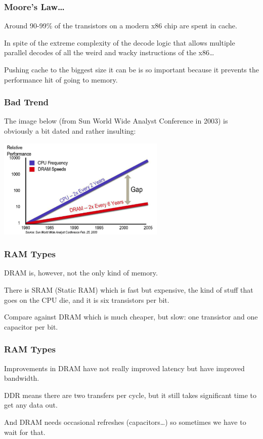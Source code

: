 \begin{frame}
\frametitle{Moore's Law\ldots}

Around 90-99\% of the transistors on a modern x86 chip are spent in cache. 

In spite of the extreme complexity of the decode logic that allows multiple parallel decodes of all the weird and wacky instructions of the x86\ldots

Pushing cache to the biggest size it can be is so important because it prevents the performance hit of going to memory.


\end{frame}



\begin{frame}
\frametitle{Bad Trend}

The image below (from Sun World Wide Analyst Conference in 2003) is obviously a bit dated and rather insulting:
\begin{center}
\includegraphics[width=0.6\textwidth]{images/ram-vs-cpu.png}
\end{center}

\end{frame}



\begin{frame}
\frametitle{RAM Types}

DRAM is, however, not the only kind of memory. 

There is SRAM (Static RAM) which is fast but expensive, the kind of stuff that goes on the CPU die, and it is six transistors per bit. 

Compare against DRAM which is much cheaper, but slow: one transistor and one capacitor per bit. 

\end{frame}

\begin{frame}
\frametitle{RAM Types}

Improvements in DRAM have not really improved latency but have improved bandwidth. 

DDR means there are two transfers per cycle, but it still takes significant time to get any data out. 

And DRAM needs occasional refreshes (capacitors\ldots) so sometimes we have to wait for that.

\end{frame}



